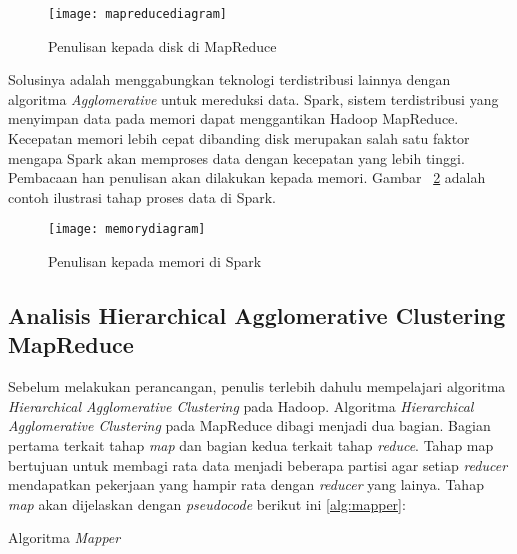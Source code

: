 \begin{figure}[H]
    \centering  
    \texttt{[image: mapreducediagram]}  
    \caption[Penulisan kepada disk di MapReduce]{Penulisan kepada disk di MapReduce} 
    \label{fig:mapreducediagram} 
\end{figure}


Solusinya adalah menggabungkan teknologi terdistribusi lainnya dengan  algoritma \textit{Agglomerative} untuk mereduksi data. Spark, sistem terdistribusi yang menyimpan data pada memori dapat menggantikan Hadoop MapReduce. Kecepatan memori lebih cepat dibanding disk merupakan salah satu faktor mengapa Spark akan memproses data dengan kecepatan yang lebih tinggi.  Pembacaan han penulisan akan dilakukan kepada memori. Gambar ~\ref{fig:memorydiagram} adalah contoh ilustrasi tahap proses data di Spark. 
	
\begin{figure}[H]
    \centering  
    \texttt{[image: memorydiagram]}  
    \caption[Penulisan kepada memori di Spark]{Penulisan kepada memori di Spark} 
    \label{fig:memorydiagram} 
\end{figure}

 
\subsection{Analisis Hierarchical Agglomerative Clustering MapReduce}

Sebelum melakukan perancangan, penulis terlebih dahulu mempelajari algoritma \textit{Hierarchical Agglomerative Clustering} pada Hadoop. Algoritma \textit{Hierarchical Agglomerative Clustering}  pada MapReduce dibagi menjadi dua bagian. Bagian pertama terkait tahap \textit{map} dan bagian kedua terkait tahap \textit{reduce}. Tahap map bertujuan untuk membagi rata data menjadi beberapa partisi agar setiap \textit{reducer} mendapatkan pekerjaan yang hampir rata dengan \textit{reducer} yang lainya. Tahap \textit{map} akan dijelaskan dengan \textit{pseudocode} berikut ini \ref{alg:mapper}:\\

\begin{algorithm}[H]
	\DontPrintSemicolon\SetAlgoNoLine\LinesNumbered
	\BlankLine
	
	
	\caption{Algoritma \textit{Mapper}}
	\label{alg:mapper}
\end{algorithm}

